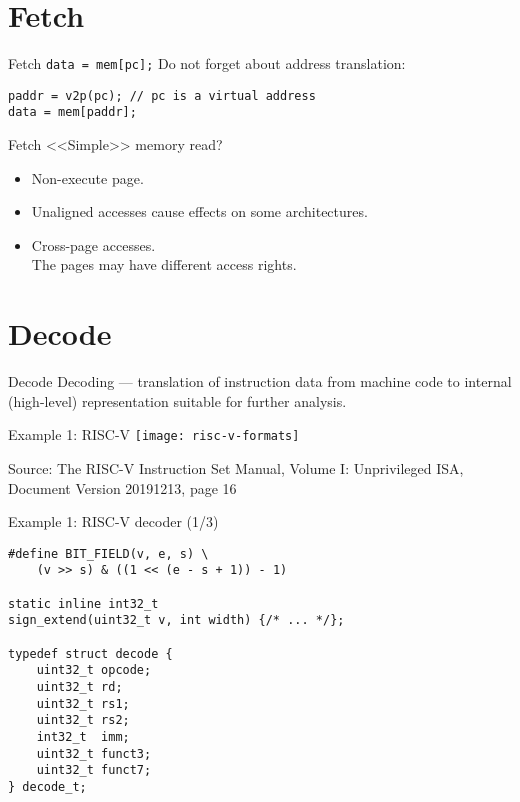 \section{Fetch}

\begin{frame}[fragile]{Fetch}
\texttt{data = mem[pc];}\pause
\vfill
Do not forget about address translation:
\begin{lstlisting}
paddr = v2p(pc); // pc is a virtual address
data = mem[paddr];
\end{lstlisting}
\end{frame}


\begin{frame}{Fetch}
<<Simple>> memory read?
\pause\bigskip
\begin{itemize}
\item Non-execute page.
\pause\bigskip
\item Unaligned accesses cause effects on some architectures.
\pause\bigskip
\item Cross-page accesses. \\
The pages may have different access rights.
\end{itemize}
\end{frame}

\section{Decode}

\begin{frame}{Decode}
Decoding --- translation of instruction data from machine code to internal
(high-level) representation suitable for further analysis.
\end{frame}

\begin{frame}{Example 1: RISC-V}
\centering
\texttt{[image: risc-v-formats]}

\tiny{Source: The RISC-V Instruction Set Manual, Volume I: Unprivileged ISA,
      Document Version 20191213, page 16}
\end{frame}

\begin{frame}[fragile]{Example 1: RISC-V decoder (1/3)}
\begin{lstlisting}
#define BIT_FIELD(v, e, s) \
    (v >> s) & ((1 << (e - s + 1)) - 1)

static inline int32_t
sign_extend(uint32_t v, int width) {/* ... */};

typedef struct decode {
    uint32_t opcode;
    uint32_t rd;
    uint32_t rs1;
    uint32_t rs2;
    int32_t  imm;
    uint32_t funct3;
    uint32_t funct7;
} decode_t;
\end{lstlisting}
\end{frame}

